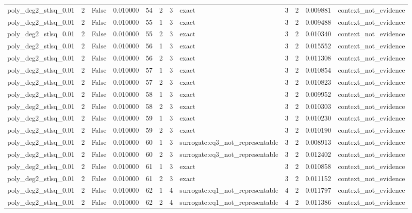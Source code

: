 \begin{tabular}{lrrrrrrlrrrl}
poly\_deg2\_stlsq\_0.01 & 2 & False & 0.010000 & 54 & 2 & 3 & exact & 3 & 2 & 0.009881 & context\_not\_evidence \\
poly\_deg2\_stlsq\_0.01 & 2 & False & 0.010000 & 55 & 1 & 3 & exact & 3 & 2 & 0.009488 & context\_not\_evidence \\
poly\_deg2\_stlsq\_0.01 & 2 & False & 0.010000 & 55 & 2 & 3 & exact & 3 & 2 & 0.010340 & context\_not\_evidence \\
poly\_deg2\_stlsq\_0.01 & 2 & False & 0.010000 & 56 & 1 & 3 & exact & 3 & 2 & 0.015552 & context\_not\_evidence \\
poly\_deg2\_stlsq\_0.01 & 2 & False & 0.010000 & 56 & 2 & 3 & exact & 3 & 2 & 0.011308 & context\_not\_evidence \\
poly\_deg2\_stlsq\_0.01 & 2 & False & 0.010000 & 57 & 1 & 3 & exact & 3 & 2 & 0.010854 & context\_not\_evidence \\
poly\_deg2\_stlsq\_0.01 & 2 & False & 0.010000 & 57 & 2 & 3 & exact & 3 & 2 & 0.010823 & context\_not\_evidence \\
poly\_deg2\_stlsq\_0.01 & 2 & False & 0.010000 & 58 & 1 & 3 & exact & 3 & 2 & 0.009952 & context\_not\_evidence \\
poly\_deg2\_stlsq\_0.01 & 2 & False & 0.010000 & 58 & 2 & 3 & exact & 3 & 2 & 0.010303 & context\_not\_evidence \\
poly\_deg2\_stlsq\_0.01 & 2 & False & 0.010000 & 59 & 1 & 3 & exact & 3 & 2 & 0.010230 & context\_not\_evidence \\
poly\_deg2\_stlsq\_0.01 & 2 & False & 0.010000 & 59 & 2 & 3 & exact & 3 & 2 & 0.010190 & context\_not\_evidence \\
poly\_deg2\_stlsq\_0.01 & 2 & False & 0.010000 & 60 & 1 & 3 & surrogate:eq3\_not\_representable & 3 & 2 & 0.008913 & context\_not\_evidence \\
poly\_deg2\_stlsq\_0.01 & 2 & False & 0.010000 & 60 & 2 & 3 & surrogate:eq3\_not\_representable & 3 & 2 & 0.012402 & context\_not\_evidence \\
poly\_deg2\_stlsq\_0.01 & 2 & False & 0.010000 & 61 & 1 & 3 & exact & 3 & 2 & 0.010858 & context\_not\_evidence \\
poly\_deg2\_stlsq\_0.01 & 2 & False & 0.010000 & 61 & 2 & 3 & exact & 3 & 2 & 0.011152 & context\_not\_evidence \\
poly\_deg2\_stlsq\_0.01 & 2 & False & 0.010000 & 62 & 1 & 4 & surrogate:eq1\_not\_representable & 4 & 2 & 0.011797 & context\_not\_evidence \\
poly\_deg2\_stlsq\_0.01 & 2 & False & 0.010000 & 62 & 2 & 4 & surrogate:eq1\_not\_representable & 4 & 2 & 0.011386 & context\_not\_evidence \\

\end{tabular}
